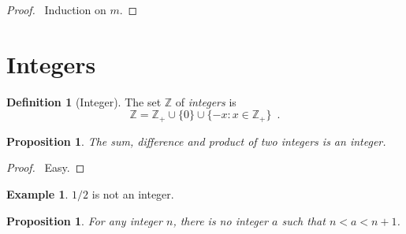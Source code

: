 \documentclass{book}
\let\qed\relax
\newtheorem{prop}[ax]{Proposition}
\theoremstyle{definition}
\newtheorem{df}[ax]{Definition}
\newtheorem{ex}[ax]{Example}
\begin{document}
\begin{proof}
\pf\ Induction on $m$. \qed
\end{proof}

\section{Integers}

\begin{df}[Integer]
The set $\mathbb{Z}$ of \emph{integers} is
\[ \mathbb{Z} = \mathbb{Z}_+ \cup \{ 0 \} \cup \{ -x : x \in \mathbb{Z}_+\} \enspace . \]
\end{df}

\begin{prop}
The sum, difference and product of two integers is an integer.
\end{prop}

\begin{proof}
\pf\ Easy. \qed
\end{proof}

\begin{ex}
$1/2$ is not an integer.
\end{ex}

\begin{prop}
For any integer $n$, there is no integer $a$ such that $n < a < n+1$.
\end{prop}
\end{document}
